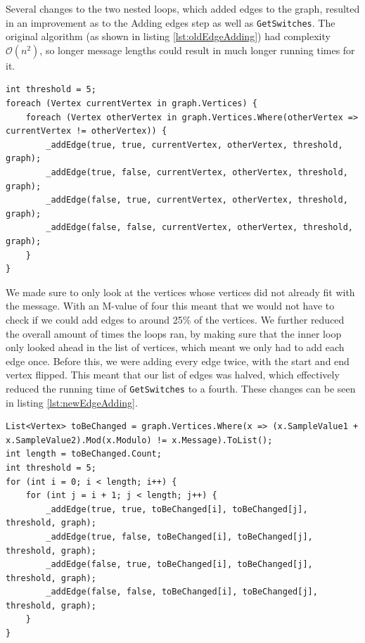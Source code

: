 Several changes to the two nested loops, which added edges to the graph, resulted in an improvement as to the Adding edges step as well as \lstinline|GetSwitches|.
The original algorithm (as shown in listing \ref{lst:oldEdgeAdding}) had complexity $\mathcal{O}(n^2)$, so longer message lengths could result in much longer running times for it.

\begin{lstlisting}[firstnumber=459,label=lst:oldEdgeAdding, caption={Original algorithm for adding edges to the graph. \textbf{File:} first\textunderscore  round/JPEGImage.cs.}]
int threshold = 5;
foreach (Vertex currentVertex in graph.Vertices) {
    foreach (Vertex otherVertex in graph.Vertices.Where(otherVertex => currentVertex != otherVertex)) {
        _addEdge(true, true, currentVertex, otherVertex, threshold, graph);
        _addEdge(true, false, currentVertex, otherVertex, threshold, graph);
        _addEdge(false, true, currentVertex, otherVertex, threshold, graph);
        _addEdge(false, false, currentVertex, otherVertex, threshold, graph);
    }
}
\end{lstlisting}

We made sure to only look at the vertices whose vertices did not already fit with the message.
With an M-value of four this meant that we would not have to check if we could add edges to around 25\% of the vertices.
We further reduced the overall amount of times the loops ran, by making sure that the inner loop only looked ahead in the list of vertices, which meant we only had to add each edge once.
Before this, we were adding every edge twice, with the start and end vertex flipped.
This meant that our list of edges was halved, which effectively reduced the running time of \lstinline|GetSwitches| to a fourth.
These changes can be seen in listing \ref{lst:newEdgeAdding}.

\begin{lstlisting}[firstnumber=449,label=lst:newEdgeAdding, caption={Improved algorithm for adding edges to the graph. \textbf{File:} second\textunderscore  round/JPEGImage.cs.}]
List<Vertex> toBeChanged = graph.Vertices.Where(x => (x.SampleValue1 + x.SampleValue2).Mod(x.Modulo) != x.Message).ToList();
int length = toBeChanged.Count;
int threshold = 5;
for (int i = 0; i < length; i++) {
    for (int j = i + 1; j < length; j++) {
        _addEdge(true, true, toBeChanged[i], toBeChanged[j], threshold, graph);
        _addEdge(true, false, toBeChanged[i], toBeChanged[j], threshold, graph);
        _addEdge(false, true, toBeChanged[i], toBeChanged[j], threshold, graph);
        _addEdge(false, false, toBeChanged[i], toBeChanged[j], threshold, graph);
    }
}
\end{lstlisting}

